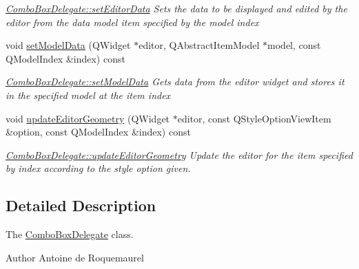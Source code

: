 \begin{DoxyCompactItemize}
\begin{DoxyCompactList}\small\item\em \hyperlink{classGui_1_1Widgets_1_1Delegates_1_1ComboBoxDelegate_a30d218e265b7656e17fece8a73e53e90}{Combo\-Box\-Delegate\-::set\-Editor\-Data} Sets the data to be displayed and edited by the {\itshape editor} from the data model item specified by the model {\itshape index} \end{DoxyCompactList}\item 
void \hyperlink{classGui_1_1Widgets_1_1Delegates_1_1ComboBoxDelegate_a2f2d51e4e44e7f3cdc9baac783bbc1b1}{set\-Model\-Data} (Q\-Widget $\ast$editor, Q\-Abstract\-Item\-Model $\ast$model, const Q\-Model\-Index \&index) const 
\begin{DoxyCompactList}\small\item\em \hyperlink{classGui_1_1Widgets_1_1Delegates_1_1ComboBoxDelegate_a2f2d51e4e44e7f3cdc9baac783bbc1b1}{Combo\-Box\-Delegate\-::set\-Model\-Data} Gets data from the {\itshape editor} widget and stores it in the specified {\itshape model} at the item {\itshape index} \end{DoxyCompactList}\item 
void \hyperlink{classGui_1_1Widgets_1_1Delegates_1_1ComboBoxDelegate_abdf54b72e544b24cc34270154ae6aed3}{update\-Editor\-Geometry} (Q\-Widget $\ast$editor, const Q\-Style\-Option\-View\-Item \&option, const Q\-Model\-Index \&index) const 
\begin{DoxyCompactList}\small\item\em \hyperlink{classGui_1_1Widgets_1_1Delegates_1_1ComboBoxDelegate_abdf54b72e544b24cc34270154ae6aed3}{Combo\-Box\-Delegate\-::update\-Editor\-Geometry} Update the {\itshape editor} for the item specified by {\itshape index} according to the style {\itshape option} given. \end{DoxyCompactList}\end{DoxyCompactItemize}


\subsection{Detailed Description}
The \hyperlink{classGui_1_1Widgets_1_1Delegates_1_1ComboBoxDelegate}{Combo\-Box\-Delegate} class. 

\begin{DoxyAuthor}{Author}
Antoine de Roquemaurel 
\end{DoxyAuthor}


